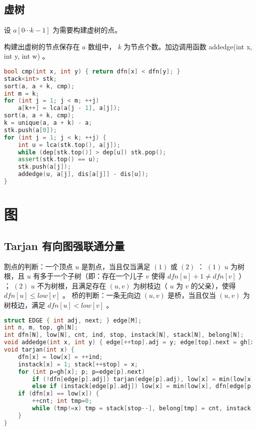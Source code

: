\documentclass[landscape,a4paper]{article}
\begin{document}
\subsection{虚树}

设 $a[0 \cdots k - 1]$ 为需要构建虚树的点。

构建出虚树的节点保存在 $a$ 数组中， $k$ 为节点个数。加边调用函数 addedge(int x, int y, int w) 。

\begin{lstlisting}[language=C++]
bool cmp(int x, int y) { return dfn[x] < dfn[y]; }
stack<int> stk;
sort(a, a + k, cmp);
int m = k;
for (int j = 1; j < m; ++j)
	a[k++] = lca(a[j - 1], a[j]);
sort(a, a + k, cmp);
k = unique(a, a + k) - a;
stk.push(a[0]);
for (int j = 1; j < k; ++j) {
	int u = lca(stk.top(), a[j]);
	while (dep[stk.top()] > dep[u]) stk.pop();
	assert(stk.top() == u);
	stk.push(a[j]);
	addedge(u, a[j], dis[a[j]] - dis[u]);
}
\end{lstlisting}

\section{图}

\subsection{Tarjan 有向图强联通分量}
 割点的判断：一个顶点 $u$ 是割点，当且仅当满足 $(1)$ 或 $(2)$ ： $(1)$ $u$ 为树根，且 $u$ 有多于一个子树（即：存在一个儿子 $v$ 使得 $dfn[u] + 1 \neq dfn[v]$ ） ； $(2)$ $u$ 不为树根，且满足存在 $(u, v)$ 为树枝边（ $u$ 为 $v$ 的父亲），使得 $dfn[u] \leq low[v]$ 。
 桥的判断：一条无向边 $(u, v)$ 是桥，当且仅当 $(u, v)$ 为树枝边，满足 $dfn[u] < low[v]$ 。
\begin{lstlisting}[language=C++]
struct EDGE { int adj, next; } edge[M];
int n, m, top, gh[N];
int dfn[N], low[N], cnt, ind, stop, instack[N], stack[N], belong[N];
void addedge(int x, int y) { edge[++top].adj = y; edge[top].next = gh[x]; gh[x] = top; }
void tarjan(int x) {
	dfn[x] = low[x] = ++ind;
	instack[x] = 1; stack[++stop] = x;
	for (int p=gh[x]; p; p=edge[p].next)
		if (!dfn[edge[p].adj]) tarjan(edge[p].adj), low[x] = min(low[x], low[edge[p].adj]);
		else if (instack[edge[p].adj]) low[x] = min(low[x], dfn[edge[p].adj]);
	if (dfn[x] == low[x]) {
		++cnt; int tmp=0;
		while (tmp!=x) tmp = stack[stop--], belong[tmp] = cnt, instack[tmp] = 0;
	}
}
\end{lstlisting}
\end{document}
